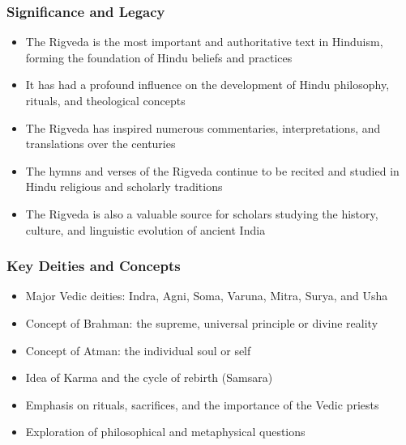 \begin{frame}[fragile]\frametitle{Significance and Legacy}
    \begin{itemize}
        \item The Rigveda is the most important and authoritative text in Hinduism, forming the foundation of Hindu beliefs and practices
        \item It has had a profound influence on the development of Hindu philosophy, rituals, and theological concepts
        \item The Rigveda has inspired numerous commentaries, interpretations, and translations over the centuries
        \item The hymns and verses of the Rigveda continue to be recited and studied in Hindu religious and scholarly traditions
        \item The Rigveda is also a valuable source for scholars studying the history, culture, and linguistic evolution of ancient India
    \end{itemize}
\end{frame}

\begin{frame}[fragile]\frametitle{Key Deities and Concepts}
    \begin{itemize}
        \item Major Vedic deities: Indra, Agni, Soma, Varuna, Mitra, Surya, and Usha
        \item Concept of Brahman: the supreme, universal principle or divine reality
        \item Concept of Atman: the individual soul or self
        \item Idea of Karma and the cycle of rebirth (Samsara)
        \item Emphasis on rituals, sacrifices, and the importance of the Vedic priests
        \item Exploration of philosophical and metaphysical questions
    \end{itemize}
\end{frame}



